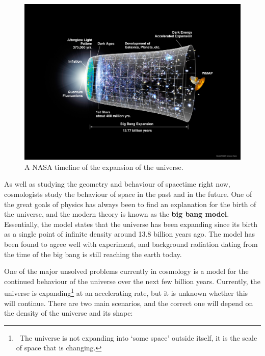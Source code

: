 \documentclass[a4paper]{amsbook}
\theoremstyle{definition}
\numberwithin{exercise}{chapter}
\numberwithin{exercise}{chapter}
\newcommand\capcite[1]{}
\begin{document}
\begin{figure}
  \centering
  \includegraphics[width=\textwidth]{bigbang}
  \caption{A NASA timeline of the expansion of the universe. \capcite{https://map.gsfc.nasa.gov/media/060915/060915_CMB_Timeline300.jpg} \label{fig:eht}}
\end{figure}

As well as studying the geometry and behaviour of spacetime right now, cosmologists study the behaviour of space in the past and in the future. One of the great
goals of physics has always been to find an explanation for the birth of the universe, and the modern theory is known as the \textbf{big bang model}. Essentially,
the model states that the universe has been expanding since its birth as a single point of infinite density around 13.8 billion years ago. The model has been
found to agree well with experiment, and background radiation dating from the time of the big bang is still reaching the earth today.

One of the major unsolved problems currently in cosmology is a model for the continued behaviour of the universe over the next few billion years. Currently, the
universe is expanding\footnote{~The universe is not expanding into `some space' outside itself, it is the scale of space that is changing.} at an accelerating
rate, but it is unknown whether this will continue. There are two main scenarios, and the correct one will depend on the density of the universe and its shape:
\end{document}
